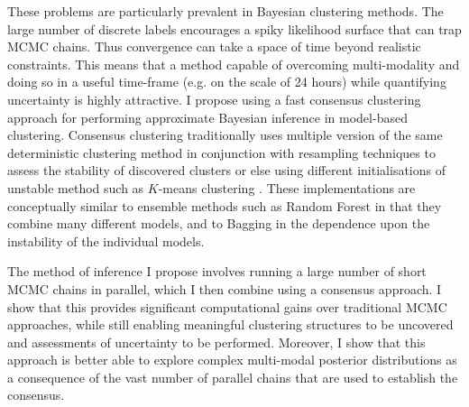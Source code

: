 \documentclass[12pt]{article} %
\begin{document}
	
	
	These problems are particularly prevalent in Bayesian clustering methods. The large number of discrete labels encourages a spiky likelihood surface that can trap MCMC chains. Thus convergence can take a space of time beyond realistic constraints. This means that a method capable of overcoming multi-modality and doing so in a useful time-frame (e.g. on the scale of 24 hours) while quantifying uncertainty is highly attractive. I propose using a fast consensus clustering approach for performing approximate Bayesian inference in model-based clustering.  Consensus clustering traditionally uses multiple version of the same deterministic clustering method in conjunction with resampling techniques to assess the stability of discovered clusters or else using different initialisations of unstable method such as $K$-means clustering \cite{MontiConsensusClusteringResamplingBased}. These implementations are conceptually similar to ensemble methods such as Random Forest \cite{BreimanRandomForests1} in that they combine many different models, and to Bagging \cite{BreimanBaggingpredictors1996} in the dependence upon the instability of the individual models.
	
	The method of inference I propose involves running a large number of short MCMC chains in parallel, which I then combine using a consensus approach. I show that this provides significant computational gains over traditional MCMC approaches, while still enabling meaningful clustering structures to be uncovered and assessments of uncertainty to be performed. Moreover, I show that this approach is better able to explore complex multi-modal posterior distributions as a consequence of the vast number of parallel chains that are used to establish the consensus.
	
\end{document}
